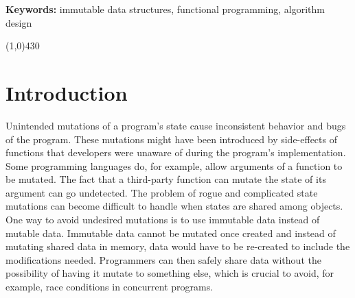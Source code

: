 \documentclass[12pt,twoside]{article}
\begin{document}
\vspace{5mm}

\noindent \textbf{Keywords:} immutable data structures, functional programming, algorithm design

\vspace{4mm}
\begin{center}
	\line(1,0){430}
\end{center}



\newpage
\tableofcontents
\newpage

\setcounter{page}{1}

\section{Introduction}
Unintended mutations of a program’s state cause inconsistent behavior and bugs of the
program. These mutations might have been introduced by side-effects of functions that developers
were unaware of during the program’s implementation. Some programming languages do, for example,
allow arguments of a function to be mutated. The fact that a third-party function can mutate the
state of its argument can go undetected. The problem of rogue and complicated state mutations can
become difficult to handle when states are shared among objects. One way to avoid undesired mutations
is to use immutable data instead of mutable data. Immutable data cannot be mutated once created
and instead of mutating shared data in memory, data would have to be re-created to include the modifications
needed. Programmers can then safely share data without the possibility of having it mutate to
something else, which is crucial to avoid, for example, race conditions in concurrent programs.
\end{document}
